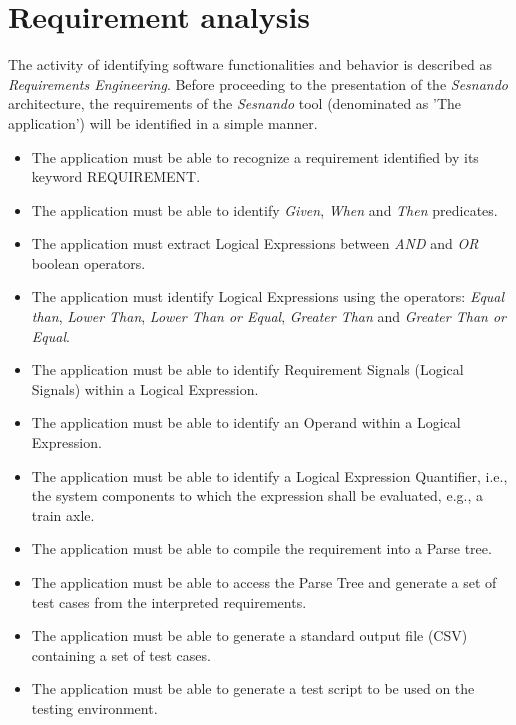 \section{Requirement analysis}
\label{sec:requirement_analysis}

The activity of identifying software functionalities and behavior is described as \textit{Requirements Engineering}. Before proceeding to the presentation of the \textit{Sesnando} architecture, the requirements of the \textit{Sesnando} tool (denominated as 'The application') will be identified in a simple manner.

\begin{itemize}
\item The application must be able to recognize a requirement identified by its keyword REQUIREMENT.
\item The application must be able to identify \textit{Given}, \textit{When} and \textit{Then} predicates.
\item The application must extract Logical Expressions between \textit{AND} and \textit{OR} boolean operators.
\item The application must identify Logical Expressions using the operators: \textit{Equal than}, \textit{Lower Than}, \textit{Lower Than or Equal}, \textit{Greater Than} and \textit{Greater Than or Equal}.
\item The application must be able to identify Requirement Signals (Logical Signals) within a Logical Expression.
\item The application must be able to identify an Operand within a Logical Expression.
\item The application must be able to identify a Logical Expression Quantifier, i.e., the system components to which the expression shall be evaluated, e.g., a train axle.
\item The application must be able to compile the requirement into a Parse tree.
\item The application must be able to access the Parse Tree and generate a set of test cases from the interpreted requirements.
\item The application must be able to generate a standard output file (CSV) containing a set of test cases.
\item The application must be able to generate a test script to be used on the testing environment.
\end{itemize}